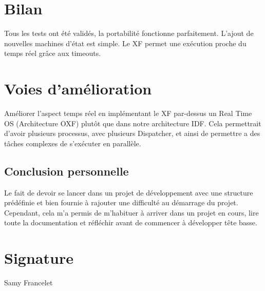 \section{Bilan}
Tous les tests ont été validés, la portabilité fonctionne parfaitement.
L'ajout de nouvelles machines d'état est simple.
Le XF permet une exécution proche du temps réel grâce aux timeouts.

\section{Voies d'amélioration}
Améliorer l'aspect temps réel en implémentant le XF par-dessus un Real Time OS
(Architecture OXF) plutôt que dans notre architecture IDF.
Cela permettrait d'avoir plusieurs processus, avec plusieurs Dispatcher, et
ainsi de permettre a des tâches complexes de s'exécuter en parallèle.

\begin{summary}
\section{Conclusion personnelle}
Le fait de devoir se lancer dans un projet de développement
avec une structure prédéfinie et bien fournie à rajouter une
difficulté au démarrage du projet. Cependant, cela m'a permis
de m'habituer à arriver dans un projet en cours, lire toute la
documentation et réfléchir avant de commencer à développer
tête basse.
\end{summary}

\section{Signature}
Samy Francelet